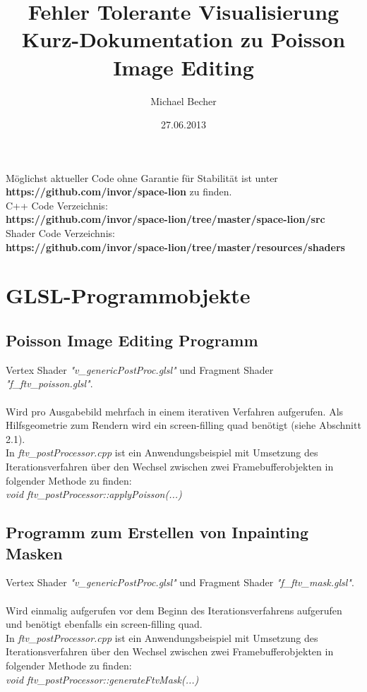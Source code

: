 \documentclass[10pt,a4paper,notitlepage]{article}
\title{\textbf{Fehler Tolerante Visualisierung}\\
Kurz-Dokumentation zu Poisson Image Editing}
\date{27.06.2013}
\author{Michael Becher}
\begin{document}
\maketitle
\begin{center}
Möglichst aktueller Code ohne Garantie für Stabilität ist unter \\
\textbf{https://github.com/invor/space-lion} zu finden.\\ \vspace{0.25cm}
C++ Code Verzeichnis:\\ \textbf{https://github.com/invor/space-lion/tree/master/space-lion/src}\\
Shader Code Verzeichnis:\\ \textbf{https://github.com/invor/space-lion/tree/master/resources/shaders}
\end{center}
\section{GLSL-Programmobjekte}
\subsection{Poisson Image Editing Programm}
Vertex Shader \textit{"v\_genericPostProc.glsl"} und Fragment Shader \textit{"f\_ftv\_poisson.glsl"}.\\ \\
Wird pro Ausgabebild mehrfach in einem iterativen Verfahren aufgerufen. Als Hilfsgeometrie zum Rendern wird ein screen-filling quad benötigt (siehe Abschnitt 2.1).\\
In \textit{ftv\_postProcessor.cpp} ist ein Anwendungsbeispiel mit Umsetzung des Iterationsverfahren über den Wechsel zwischen zwei Framebufferobjekten in folgender Methode zu finden:\\
\textit{void ftv\_postProcessor::applyPoisson(...)}
\subsection{Programm zum Erstellen von Inpainting Masken}
Vertex Shader \textit{"v\_genericPostProc.glsl"} und Fragment Shader \textit{"f\_ftv\_mask.glsl"}.\\ \\
Wird einmalig aufgerufen vor dem Beginn des Iterationsverfahrens aufgerufen und benötigt ebenfalls ein screen-filling quad.\\
In \textit{ftv\_postProcessor.cpp} ist ein Anwendungsbeispiel mit Umsetzung des Iterationsverfahren über den Wechsel zwischen zwei Framebufferobjekten in folgender Methode zu finden:\\
\textit{void ftv\_postProcessor::generateFtvMask(...)}
\end{document}
